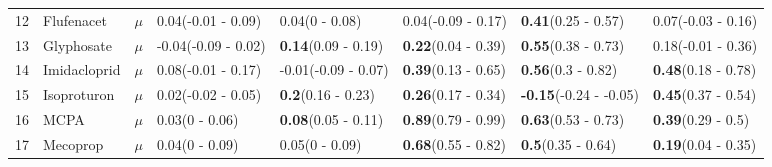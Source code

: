 \begin{longtable}{lp{2cm}p{0.7cm}p{2cm}p{2cm}p{2cm}p{2cm}p{2cm}}
  12 & Flufenacet & $\mu$ & 0.04\newline (-0.01 - 0.09) & 0.04\newline (0 - 0.08) & 0.04\newline (-0.09 - 0.17) & \textbf{0.41}\newline (0.25 - 0.57) & 0.07\newline (-0.03 - 0.16) \\ 
  13 & Glyphosate & $\mu$ & -0.04\newline (-0.09 - 0.02) & \textbf{0.14}\newline (0.09 - 0.19) & \textbf{0.22}\newline (0.04 - 0.39) & \textbf{0.55}\newline (0.38 - 0.73) & 0.18\newline (-0.01 - 0.36) \\ 
  14 & Imidacloprid & $\mu$ & 0.08\newline (-0.01 - 0.17) & -0.01\newline (-0.09 - 0.07) & \textbf{0.39}\newline (0.13 - 0.65) & \textbf{0.56}\newline (0.3 - 0.82) & \textbf{0.48}\newline (0.18 - 0.78) \\ 
  15 & Isoproturon & $\mu$ & 0.02\newline (-0.02 - 0.05) & \textbf{0.2}\newline (0.16 - 0.23) & \textbf{0.26}\newline (0.17 - 0.34) & \textbf{-0.15}\newline (-0.24 - -0.05) & \textbf{0.45}\newline (0.37 - 0.54) \\ 
  16 & MCPA & $\mu$ & 0.03\newline (0 - 0.06) & \textbf{0.08}\newline (0.05 - 0.11) & \textbf{0.89}\newline (0.79 - 0.99) & \textbf{0.63}\newline (0.53 - 0.73) & \textbf{0.39}\newline (0.29 - 0.5) \\ 
  17 & Mecoprop & $\mu$ & 0.04\newline (0 - 0.09) & 0.05\newline (0 - 0.09) & \textbf{0.68}\newline (0.55 - 0.82) & \textbf{0.5}\newline (0.35 - 0.64) & \textbf{0.19}\newline (0.04 - 0.35) \\ 

\end{longtable}

